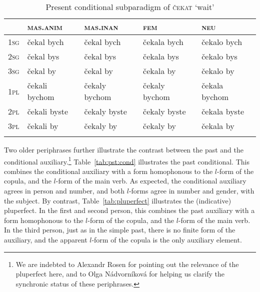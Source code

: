 \documentclass[output=paper]{langsci/langscibook}
\begin{document}
\begin{table}
\small
\begin{tabular}{lllll}
\lsptoprule
& \scshape mas.anim & \scshape mas.inan & \scshape fem & \scshape neu\\
\midrule
\scshape 1sg & \v{c}ekal bych  & \v{c}ekal bych &  \v{c}ekala bych &  \v{c}ekalo bych\\ 
\scshape 2sg & \v{c}ekal bys & \v{c}ekal bys  &  \v{c}ekala bys&  \v{c}ekalo bys\\ 
\scshape 3sg &  \v{c}ekal by &  \v{c}ekal by &  \v{c}ekala by &  \v{c}ekalo by\\ 
\scshape 1pl & \v{c}ekali bychom & \v{c}ekaly bychom &  \v{c}ekaly bychom &  \v{c}ekala bychom\\
\scshape 2pl &  \v{c}ekali byste &  \v{c}ekaly byste&  \v{c}ekaly byste&  \v{c}ekala byste\\
\scshape 3pl &  \v{c}ekali by&  \v{c}ekaly by&  \v{c}ekaly by&  \v{c}ekala by\\
\lspbottomrule
\end{tabular}
\caption{Present conditional subparadigm of \textsc{\v{c}ekat} ‘wait’ \label{tab:prs:cond} }
\end{table}


Two older periphrases further illustrate the contrast between the past and the conditional auxiliary.\footnote{We are indebted to Alexandr Rosen for pointing out the relevance of the pluperfect here, and to Olga Nádvorníková for helping us clarify the synchronic status of these periphrases.} Table~\ref{tab:pst:cond} illustrates the past conditional.  This combines the conditional auxiliary with a form homophonous to the $l$-form of the copula, and the $l$-form of the main verb. As expected, the conditional auxiliary agrees in person and number, and both $l$-forms agree in number and gender, with the subject. By contrast, Table~\ref{tab:pluperfect} illustrates the (indicative) pluperfect. In the first and second person, this combines the past auxiliary with a form homophonous to the $l$-form of the copula, and the $l$-form of the main verb. In the third person, just as in the simple past, there is no finite form of the auxiliary, and the apparent $l$-form of the copula is the only auxiliary element.
\end{document}
